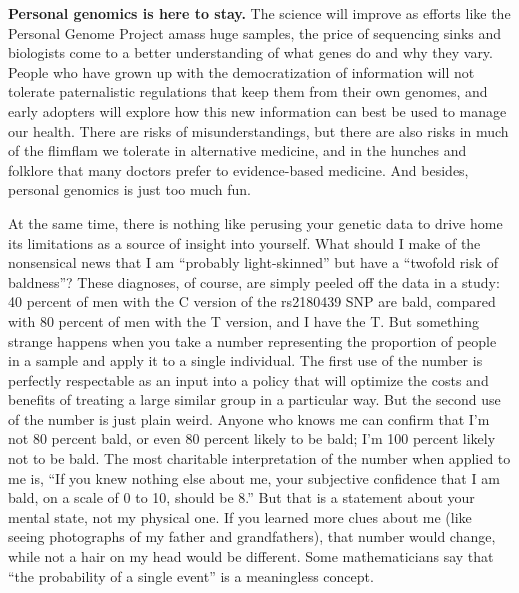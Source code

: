 \textbf{Personal genomics is here to stay.} The science will improve as
efforts like the Personal Genome Project amass huge samples, the price
of sequencing sinks and biologists come to a better understanding of
what genes do and why they vary. People who have grown up with the
democratization of information will not tolerate paternalistic
regulations that keep them from their own genomes, and early adopters
will explore how this new information can best be used to manage our
health. There are risks of misunderstandings, but there are also risks
in much of the flimflam we tolerate in alternative medicine, and in the
hunches and folklore that many doctors prefer to evidence-based
medicine. And besides, personal genomics is just too much fun.

At the same time, there is nothing like perusing your genetic data to
drive home its limitations as a source of insight into yourself. What
should I make of the nonsensical news that I am ``probably
light-skinned'' but have a ``twofold risk of baldness''? These
diagnoses, of course, are simply peeled off the data in a study: 40
percent of men with the C version of the rs2180439 SNP are bald,
compared with 80 percent of men with the T version, and I have the T.
But something strange happens when you take a number representing the
proportion of people in a sample and apply it to a single individual.
The first use of the number is perfectly respectable as an input into a
policy that will optimize the costs and benefits of treating a large
similar group in a particular way. But the second use of the number is
just plain weird. Anyone who knows me can confirm that I'm not 80
percent bald, or even 80 percent likely to be bald; I'm 100 percent
likely not to be bald. The most charitable interpretation of the number
when applied to me is, ``If you knew nothing else about me, your
subjective confidence that I am bald, on a scale of 0 to 10, should be
8.'' But that is a statement about your mental state, not my physical
one. If you learned more clues about me (like seeing photographs of my
father and grandfathers), that number would change, while not a hair on
my head would be different. Some mathematicians say that ``the
probability of a single event'' is a meaningless concept.

